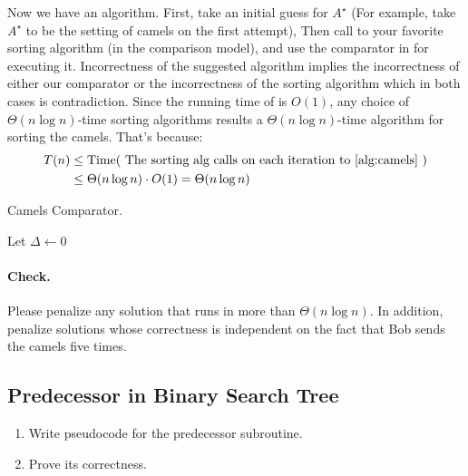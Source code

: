   Now we have an algorithm. First, take an initial guess for $A^{\star}$ (For example, take $A^{\star}$ to be the setting of camels on the first attempt), Then call to your favorite sorting algorithm (in the comparison model), and use the comparator in  for executing it. Incorrectness of the suggested algorithm implies the incorrectness of either our comparator or the incorrectness of the sorting algorithm which in both cases is contradiction. Since the running time of  is $O(1)$, any choice of $\Theta(n\log n)$-time sorting algorithms results a $\Theta(n\log n)$-time algorithm for sorting the camels. That's because:   
  \begin{equation*}
    \begin{split}
      T(n) & \le \text{Time} ( \text{ The sorting alg calls on each iteration to \Cref{alg:camels} } ) \\ 
      & \le \Theta( n \log n) \cdot O(1)  = \Theta(n\log n)
    \end{split}
  \end{equation*}


   \begin{algorithm}
\caption{Camels Comparator.} \label{alg:camels}
     Let $\Delta \leftarrow 0$ \\
      {
     }
\end{algorithm}
\ifdefined\CHECK

  \paragraph{Check.} Please penalize any solution that runs in more than $\Theta(n\log n)$. In addition, penalize solutions whose correctness is independent on the fact that Bob sends the camels five times.
\fi



\fi

\subsection{Predecessor in Binary Search Tree}
\begin{enumerate}
  \item Write pseudocode for the predecessor subroutine.
  \item Prove its correctness.
\end{enumerate}
\ifdefined\SOLUTION
